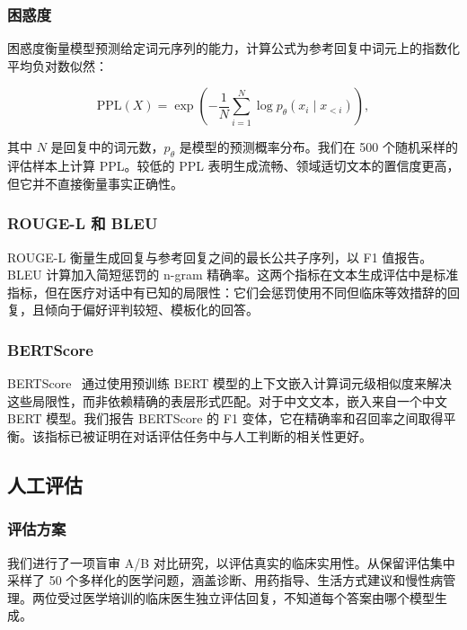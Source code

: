 \documentclass[12pt,a4paper]{article}
\begin{document}
\subsubsection{困惑度}

困惑度衡量模型预测给定词元序列的能力，计算公式为参考回复中词元上的指数化平均负对数似然：

\begin{equation}
\text{PPL}(X) = \exp\left(-\frac{1}{N}\sum_{i=1}^{N} \log p_\theta(x_i \mid x_{<i})\right),
\end{equation}

其中 $N$ 是回复中的词元数，$p_\theta$ 是模型的预测概率分布。我们在 500 个随机采样的评估样本上计算 PPL。较低的 PPL 表明生成流畅、领域适切文本的置信度更高，但它并不直接衡量事实正确性。

\subsubsection{ROUGE-L 和 BLEU}

ROUGE-L 衡量生成回复与参考回复之间的最长公共子序列，以 F1 值报告。BLEU 计算加入简短惩罚的 n-gram 精确率。这两个指标在文本生成评估中是标准指标，但在医疗对话中有已知的局限性：它们会惩罚使用不同但临床等效措辞的回复，且倾向于偏好评判较短、模板化的回答。

\subsubsection{BERTScore}

BERTScore~\cite{zhang2019bertscore} 通过使用预训练 BERT 模型的上下文嵌入计算词元级相似度来解决这些局限性，而非依赖精确的表层形式匹配。对于中文文本，嵌入来自一个中文 BERT 模型。我们报告 BERTScore 的 F1 变体，它在精确率和召回率之间取得平衡。该指标已被证明在对话评估任务中与人工判断的相关性更好。

\subsection{人工评估}

\subsubsection{评估方案}

我们进行了一项盲审 A/B 对比研究，以评估真实的临床实用性。从保留评估集中采样了 50 个多样化的医学问题，涵盖诊断、用药指导、生活方式建议和慢性病管理。两位受过医学培训的临床医生独立评估回复，不知道每个答案由哪个模型生成。
\end{document}
